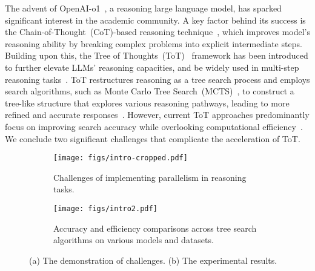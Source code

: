 The advent of OpenAI-o1~\cite{jaech2024openai}, a reasoning large language model, has sparked significant interest in the academic community. A key factor behind its success is the Chain-of-Thought~(CoT)-based reasoning technique~\cite{Wei_2022_Chain, chu2023survey}, which improves model’s reasoning ability by breaking complex problems into explicit intermediate steps. Building upon this, the Tree of Thoughts~(ToT)~\cite{Yao_2023_Tree} framework has been introduced to further elevate LLMs’ reasoning capacities, and be widely used in multi-step reasoning tasks~\cite{plaat2024reasoning}. ToT restructures reasoning as a tree search process and employs search algorithms, such as Monte Carlo Tree Search~(MCTS)~\cite{chaslot2008monte,xie2024monte}, to construct a tree-like structure that explores various reasoning pathways, leading to more refined and accurate responses~\cite{sprueill2023monte}.
However, current ToT approaches predominantly focus on improving search accuracy while overlooking computational efficiency~\cite{xie2024monte, cheng2024self, zhao2024marco}. We conclude two significant challenges that complicate the acceleration of ToT. 

\begin{figure}
   \begin{subfigure}{\linewidth}
   \vspace{-0.1in}
    \texttt{[image: figs/intro-cropped.pdf]}
    \caption{Challenges of implementing parallelism in reasoning tasks.}
    \label{fig:intro}
\end{subfigure}
\hfill
\begin{subfigure}{\linewidth}
    \texttt{[image: figs/intro2.pdf]}
    \caption{Accuracy and efficiency comparisons across tree search algorithms on various models and datasets.}
    \label{fig:comparison}
\end{subfigure}
\vspace{-0.2in}
\caption{(a) The demonstration of challenges. (b) The experimental results. }
\vspace{-0.25in}
\end{figure}


